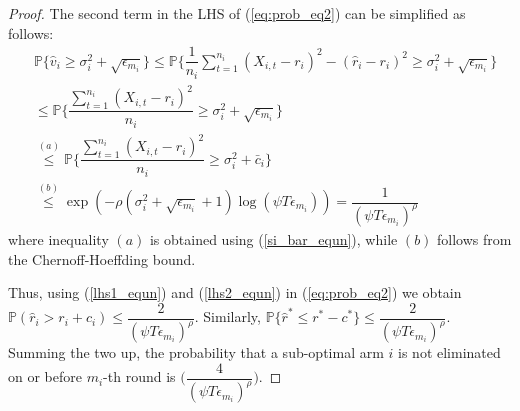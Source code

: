 \begin{proof}
 
The second term in the LHS of (\ref{eq:prob_eq2}) can be simplified as follows:
\begin{align}
&\mathbb{P}\bigg\lbrace \hat{v}_{i}\geq \sigma_{i}^{2}+\sqrt{\epsilon_{m_{i}}}\bigg\rbrace\nonumber
\leq \mathbb{P}\bigg\lbrace \dfrac{1}{n_{i}}\sum_{t=1}^{n_{i}}(X_{i,t}-r_{i})^{2}-(\hat{r}_{i}-r_{i})^{2}\geq \sigma_{i}^{2}+\sqrt{\epsilon_{m_{i}}}\bigg\rbrace\nonumber\\
&\leq \mathbb{P}\bigg\lbrace \dfrac{\sum_{t=1}^{n_{i}}(X_{i,t}-r_{i})^{2}}{n_{i}}\geq \sigma_{i}^{2}+\sqrt{\epsilon_{m_{i}}} \bigg\rbrace\nonumber\\
&\overset{(a)}{\leq} \mathbb{P}\bigg\lbrace \dfrac{\sum_{t=1}^{n_{i}}(X_{i,t}-r_{i})^{2}}{n_{i}}\geq \sigma_{i}^{2} + \bar{c}_i\bigg\rbrace \nonumber\\
&\overset{(b)}{\leq} \exp\left(- \rho (\sigma_{i}^{2}+\sqrt{\epsilon_{m_{i}}} + 1)\log(\psi  T\epsilon_{m_{i}})\right)
= \dfrac{1}{(\psi  T\epsilon_{m_{i}})^{\rho}}
\label{lhs2_equn}
\end{align}
where inequality $(a)$ is obtained using (\ref{si_bar_equn}), while $(b)$ follows from the Chernoff-Hoeffding bound.
  
Thus, using (\ref{lhs1_equn}) and (\ref{lhs2_equn}) in (\ref{eq:prob_eq2}) we obtain $\mathbb{P}(\hat{r}_{i}> r_{i} + c_{i})\le \dfrac{2}{(\psi  T\epsilon_{m_{i}})^{\rho}}$. 
Similarly, $\mathbb{P}\lbrace\hat{r}^{*}\leq r^{*} - c^{*}\rbrace \leq \dfrac{2}{(\psi  T\epsilon_{m_{i}})^{\rho}}$. Summing the two up, the probability that a sub-optimal arm ${i}$ is not eliminated on or before $m_{i}$-th round is  $\bigg(\dfrac{4}{(\psi T\epsilon_{m_{i}})^{\rho}} \bigg)$.


\end{proof}
